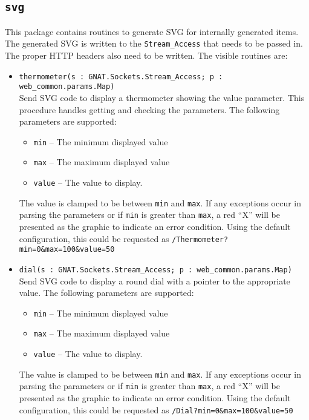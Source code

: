 \documentclass[10pt, openany, draft]{article}
\begin{document}
\subsection{\texttt{svg}}
This package contains routines to generate SVG for internally generated items.  The generated SVG is written to the \texttt{Stream\_Access} that needs to be passed in.  The proper HTTP headers also need to be written.  The visible routines are:
\begin{itemize}
  \item \verb|thermometer(s : GNAT.Sockets.Stream_Access; p : web_common.params.Map)|\\
  Send SVG code to display a thermometer showing the value parameter.  This procedure handles getting and checking the parameters.  The following parameters are supported:
  \begin{itemize}
    \item \texttt{min} -- The minimum displayed value
    \item \texttt{max} -- The maximum displayed value
    \item \texttt{value} -- The value to display.
  \end{itemize}
  The value is clamped to be between \texttt{min} and \texttt{max}.  If any exceptions occur in parsing the parameters or if \texttt{min} is greater than \texttt{max}, a red ``X'' will be presented as the graphic to indicate an error condition.  Using the default configuration, this could be requested as \texttt{/Thermometer?min=0\&max=100\&value=50}
  \item \verb|dial(s : GNAT.Sockets.Stream_Access; p : web_common.params.Map)|\\
  Send SVG code to display a round dial with a pointer to the appropriate value. The following parameters are supported:
  \begin{itemize}
    \item \texttt{min} -- The minimum displayed value
    \item \texttt{max} -- The maximum displayed value
    \item \texttt{value} -- The value to display.
  \end{itemize}
  The value is clamped to be between \texttt{min} and \texttt{max}.  If any exceptions occur in parsing the parameters or if \texttt{min} is greater than \texttt{max}, a red ``X'' will be presented as the graphic to indicate an error condition.  Using the default configuration, this could be requested as \texttt{/Dial?min=0\&max=100\&value=50}
\end{itemize}
\end{document}
